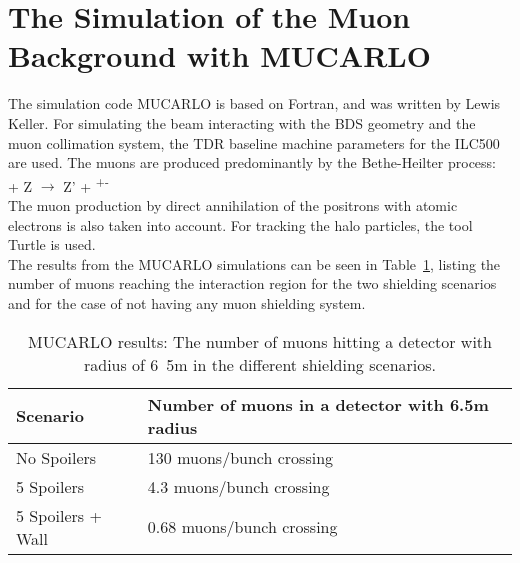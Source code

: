 \section{The Simulation of the Muon Background with MUCARLO}
\label{MUCARLO}

The simulation code MUCARLO is based on Fortran, and was written by Lewis Keller.
For simulating the beam interacting with the BDS geometry and the muon collimation system, the TDR baseline machine parameters for the ILC500 are used.
The muons are produced predominantly by the Bethe-Heilter process:\\
\textgamma + Z $\rightarrow$ Z' + \murm\textsuperscript{+}\murm\textsuperscript{-}\\
The muon production by direct annihilation of the positrons with atomic electrons is also taken into account.\cite[sec. 2]{Mucarlo}
For tracking the halo particles, the tool Turtle\cite{Turtle} is used.\\
The results from the MUCARLO simulations can be seen in Table~\ref{tab:MuonRates}, listing the number of muons reaching the interaction region for the two shielding scenarios and for the case of not having any muon shielding system.

\begin{table}
\caption{MUCARLO results: The number of muons hitting a detector with radius of \unit{6.5}{m} in the different shielding scenarios.}
\label{tab:MuonRates}
\centering
\begin{tabularx}{\textwidth}{ll}
\hline\hline
\textbf{Scenario} & \textbf{Number of muons in a detector with 6.5m radius}\\
\hline
\cline{1-2}
\hline
 No Spoilers & 130 muons/bunch crossing\\
 5 Spoilers& 4.3 muons/bunch crossing\\
 5 Spoilers + Wall & 0.68 muons/bunch crossing\\
\hline\hline
\end{tabularx}
\end{table}